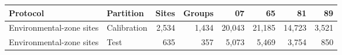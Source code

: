 \begin{tabular}{llrrrrrr}
\toprule
Protocol & Partition & Sites & Groups & 07 & 65 & 81 & 89 \\
\midrule
Environmental-zone sites & Calibration & 2,534 & 1,434 & 20,043 & 21,185 & 14,723 & 3,521 \\
Environmental-zone sites & Test & 635 & 357 & 5,073 & 5,469 & 3,754 & 850 \\
\bottomrule
\end{tabular}
